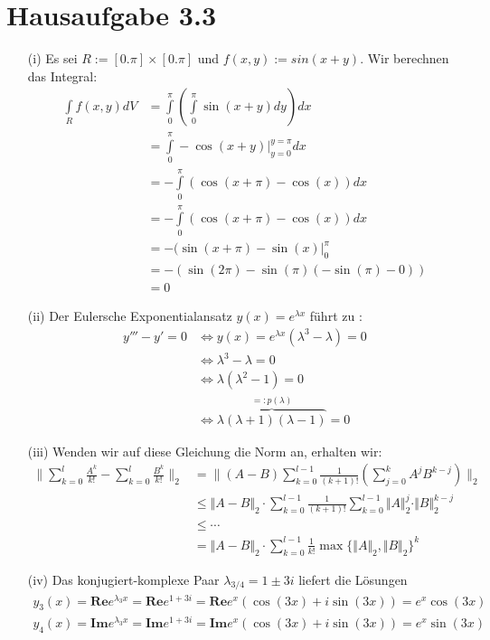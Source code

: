 \documentclass{article}
\begin{document}
\section{Hausaufgabe 3.3}
\begin{itemize}
\item[(i)] Es sei $R := [0. \pi] \times [0. \pi]$ und $f(x,y) := sin(x+y)$. Wir berechnen das Integral:
\begin{align*}
\int\limits_R f(x,y) dV 
&= \int\limits_{0}^{\pi} \left( \int\limits_{0}^{\pi} \sin(x+y) dy \right) dx \\
&= \int\limits_{0}^{\pi} - \cos(x+y) \bigg\rvert_{y = 0}^{y = \pi} dx \\
&= - \int\limits_{0}^{\pi} ( \cos(x+\pi) - \cos(x) ) dx \\
&= - \int\limits_{0}^{\pi} ( \cos(x+\pi) - \cos(x) ) dx \\
&= - (\sin( x + \pi ) - \sin(x) \bigg\rvert_0^{\pi} \\
&= - (\sin(2 \pi) - \sin(\pi) (- \sin(\pi) - 0 )) \\
&= 0
\end{align*}

\item[(ii)] Der Eulersche Exponentialansatz $y(x) = e^{\lambda x}$ führt zu :
\begin{align*}
y''' - y' = 0 &\Leftrightarrow y(x) = e^{\lambda x} (\lambda^3 - \lambda) = 0 \\
&\Leftrightarrow \lambda^3 - \lambda = 0  \\
&\Leftrightarrow \lambda(\lambda^2 -1) = 0 \\
&\Leftrightarrow \overbrace{\lambda (\lambda + 1) (\lambda - 1)}^{=: p(\lambda)} = 0 
\end{align*}

\item[(iii)] Wenden wir auf diese Gleichung die Norm an, erhalten wir: 
\begin{align*}
\bigg\lVert \sum\limits_{k = 0}^l \frac{A^k}{k!} - \sum\limits_{k = 0}^l \frac{B^k}{k!} \bigg\rVert_2 
&= \bigg\lVert (A - B) \sum\limits_{k = 0}^{l-1} \frac{1}{(k+1)!} (\sum\limits_{j = 0}^{k} A^j B^{k-j}) \bigg\rVert_2 \\
&\leq \Vert A - B \Vert_2 \cdot \sum\limits_{k = 0}^{l - 1} \frac{1}{(k+1)!} \sum\limits_{k = 0}^{l - 1} \Vert A \Vert_2^j \cdot \Vert B \Vert_2^{k-j} \\
&\leq \cdots \\
&= \Vert A - B \Vert_2 \cdot \sum\limits_{k = 0}^{l - 1} \frac{1}{k!} \max \{ \Vert A \Vert_2 , \Vert B \Vert_2 \}^k
\end{align*}
\item[(iv)] Das konjugiert-komplexe Paar $\lambda_{3/4} = 1 \pm 3i$ liefert die Lösungen 
\begin{align*}
y_3 (x) = \textbf{Re} e^{\lambda_3 x} = \textbf{Re} e^{1+3i} = \textbf{Re} e^x (\cos(3x) + i \sin(3x) ) = e^x \cos(3x) \\
y_4 (x) = \textbf{Im} e^{\lambda_3 x} = \textbf{Im} e^{1+3i} = \textbf{Im} e^x (\cos(3x) + i \sin(3x) ) = e^x \sin(3x) \\
\end{align*}
\end{itemize}
\end{document}
